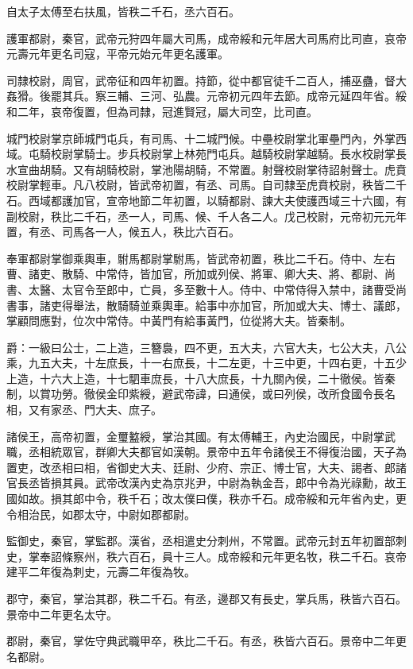 \begin{pinyinscope}
自太子太傅至右扶風，皆秩二千石，丞六百石。

護軍都尉，秦官，武帝元狩四年屬大司馬，成帝綏和元年居大司馬府比司直，哀帝元壽元年更名司寇，平帝元始元年更名護軍。

司隸校尉，周官，武帝征和四年初置。持節，從中都官徒千二百人，捕巫蠱，督大姦猾。後罷其兵。察三輔、三河、弘農。元帝初元四年去節。成帝元延四年省。綏和二年，哀帝復置，但為司隸，冠進賢冠，屬大司空，比司直。

城門校尉掌京師城門屯兵，有司馬、十二城門候。中壘校尉掌北軍壘門內，外掌西域。屯騎校尉掌騎士。步兵校尉掌上林苑門屯兵。越騎校尉掌越騎。長水校尉掌長水宣曲胡騎。又有胡騎校尉，掌池陽胡騎，不常置。射聲校尉掌待詔射聲士。虎賁校尉掌輕車。凡八校尉，皆武帝初置，有丞、司馬。自司隸至虎賁校尉，秩皆二千石。西域都護加官，宣帝地節二年初置，以騎都尉、諫大夫使護西域三十六國，有副校尉，秩比二千石，丞一人，司馬、候、千人各二人。戊己校尉，元帝初元元年置，有丞、司馬各一人，候五人，秩比六百石。

奉軍都尉掌御乘輿車，駙馬都尉掌駙馬，皆武帝初置，秩比二千石。侍中、左右曹、諸吏、散騎、中常侍，皆加官，所加或列侯、將軍、卿大夫、將、都尉、尚書、太醫、太官令至郎中，亡員，多至數十人。侍中、中常侍得入禁中，諸曹受尚書事，諸吏得舉法，散騎騎並乘輿車。給事中亦加官，所加或大夫、博士、議郎，掌顧問應對，位次中常侍。中黃門有給事黃門，位從將大夫。皆秦制。

爵：一級曰公士，二上造，三簪裊，四不更，五大夫，六官大夫，七公大夫，八公乘，九五大夫，十左庶長，十一右庶長，十二左更，十三中更，十四右更，十五少上造，十六大上造，十七駟車庶長，十八大庶長，十九關內侯，二十徹侯。皆秦制，以賞功勞。徹侯金印紫綬，避武帝諱，曰通侯，或曰列侯，改所食國令長名相，又有家丞、門大夫、庶子。

諸侯王，高帝初置，金璽盭綬，掌治其國。有太傅輔王，內史治國民，中尉掌武職，丞相統眾官，群卿大夫都官如漢朝。景帝中五年令諸侯王不得復治國，天子為置吏，改丞相曰相，省御史大夫、廷尉、少府、宗正、博士官，大夫、謁者、郎諸官長丞皆損其員。武帝改漢內史為京兆尹，中尉為執金吾，郎中令為光祿勳，故王國如故。損其郎中令，秩千石；改太僕曰僕，秩亦千石。成帝綏和元年省內史，更令相治民，如郡太守，中尉如郡都尉。

監御史，秦官，掌監郡。漢省，丞相遣史分刺州，不常置。武帝元封五年初置部刺史，掌奉詔條察州，秩六百石，員十三人。成帝綏和元年更名牧，秩二千石。哀帝建平二年復為刺史，元壽二年復為牧。

郡守，秦官，掌治其郡，秩二千石。有丞，邊郡又有長史，掌兵馬，秩皆六百石。景帝中二年更名太守。

郡尉，秦官，掌佐守典武職甲卒，秩比二千石。有丞，秩皆六百石。景帝中二年更名都尉。


\end{pinyinscope}

